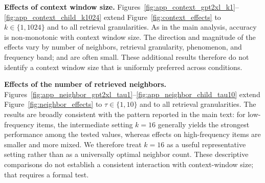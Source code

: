 \noindent \textbf{Effects of context window size.}
Figures~\ref{fig:app_context_gpt2xl_k1}--\ref{fig:app_context_child_k1024} extend Figure~\ref{fig:context_effects} to $k \in \{1, 1024\}$ and to all retrieval granularities. As in the main analysis, accuracy is non-monotonic with context window size. The direction and magnitude of the effects vary by number of neighbors, retrieval granularity, phenomenon, and frequency band; and are often small. These additional results therefore do not identify a context window size that is uniformly preferred across conditions.


\noindent \textbf{Effects of the number of retrieved neighbors.}
Figures~\ref{fig:app_neighbor_gpt2xl_tau1}--\ref{fig:app_neighbor_child_tau10} extend Figure~\ref{fig:neighbor_effects} to $\tau \in \{1, 10\}$ and to all retrieval granularities. The results are broadly consistent with the pattern reported in the main text: for low-frequency items, the intermediate setting $k=16$ generally yields the strongest performance among the tested values, whereas effects on high-frequency items are smaller and more mixed. We therefore treat $k=16$ as a useful representative setting rather than as a universally optimal neighbor count. These descriptive comparisons do not establish a consistent interaction with context-window size; that requires a formal test.




